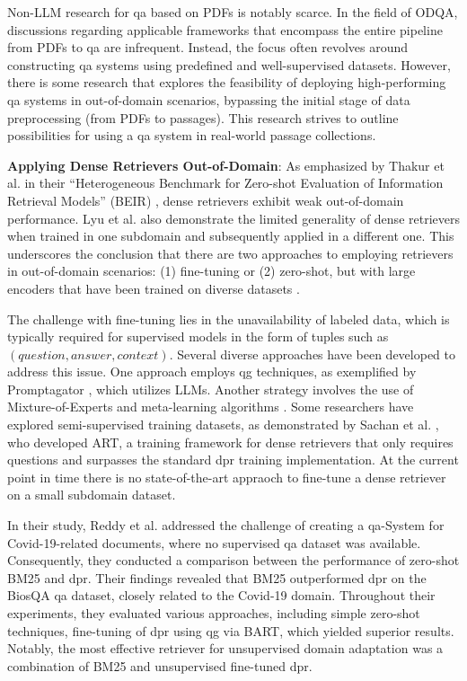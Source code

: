 Non-LLM research for \gls{qa} based on PDFs is notably scarce. In the field of ODQA, discussions regarding applicable frameworks that encompass the entire pipeline from PDFs to \gls{qa} are infrequent. Instead, the focus often revolves around constructing \gls{qa} systems using predefined and well-supervised datasets. However, there is some research that explores the feasibility of deploying high-performing \gls{qa} systems in out-of-domain scenarios, bypassing the initial stage of data preprocessing (from PDFs to passages). This research strives to outline possibilities for using a \gls{qa} system in real-world passage collections.

\noindent \textbf{Applying Dense Retrievers Out-of-Domain}: As emphasized by Thakur et al. in their \enquote{Heterogeneous Benchmark for Zero-shot Evaluation of Information Retrieval Models} (BEIR) \cite{thakur_beir_2021}, dense retrievers exhibit weak out-of-domain performance. Lyu et al. \cite{farea_evaluation_2022} also demonstrate the limited generality of dense retrievers when trained in one subdomain and subsequently applied in a different one. This underscores the conclusion that there are two approaches to employing retrievers in out-of-domain scenarios: (1) fine-tuning or (2) zero-shot, but with large encoders that have been trained on diverse datasets \cite{ni_large_2021}.

The challenge with fine-tuning lies in the unavailability of labeled data, which is typically required for supervised models in the form of tuples such as $(question, answer, context)$. Several diverse approaches have been developed to address this issue. One approach employs \gls{qg} techniques, as exemplified by Promptagator \cite{dai_promptagator_2022}, which utilizes LLMs. Another strategy involves the use of Mixture-of-Experts and meta-learning algorithms \cite{chen_improving_2021}. Some researchers have explored semi-supervised training datasets, as demonstrated by Sachan et al. \cite{sachan_questions_2023}, who developed ART, a training framework for dense retrievers that only requires questions and surpasses the standard \gls{dpr} training implementation. At the current point in time there is no state-of-the-art appraoch to fine-tune a dense retriever on a small subdomain dataset.

In their study, Reddy et al. \cite{reddy_synthetic_2022} addressed the challenge of creating a \gls{qa}-System for Covid-19-related documents, where no supervised \gls{qa} dataset was available. Consequently, they conducted a comparison between the performance of zero-shot BM25 and \gls{dpr}. Their findings revealed that BM25 outperformed \gls{dpr} on the BiosQA \gls{qa} dataset, closely related to the Covid-19 domain. Throughout their experiments, they evaluated various approaches, including simple zero-shot techniques, fine-tuning of \gls{dpr} using \gls{qg} via BART, which yielded superior results. Notably, the most effective retriever for unsupervised domain adaptation was a combination of BM25 and unsupervised fine-tuned \gls{dpr}.

